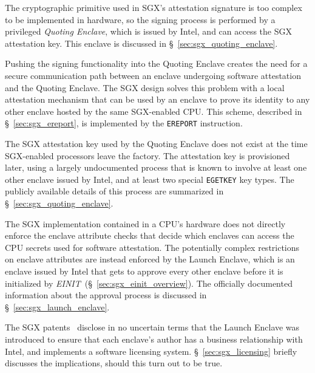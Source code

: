 The cryptographic primitive used in SGX's attestation signature is too complex
to be implemented in hardware, so the signing process is performed by a
privileged \textit{Quoting Enclave}, which is issued by Intel, and can access
the SGX attestation key. This enclave is discussed in
\S~\ref{sec:sgx_quoting_enclave}.

Pushing the signing functionality into the Quoting Enclave creates the need for
a secure communication path between an enclave undergoing software attestation
and the Quoting Enclave. The SGX design solves this problem with a local
attestation mechanism that can be used by an enclave to prove its identity to
any other enclave hosted by the same SGX-enabled CPU. This scheme, described in
\S~\ref{sec:sgx_ereport}, is implemented by the \texttt{EREPORT} instruction.


The SGX attestation key used by the Quoting Enclave does not exist at the time
SGX-enabled processors leave the factory. The attestation key is provisioned
later, using a largely undocumented process that is known to involve at least
one other enclave issued by Intel, and at least two special \texttt{EGETKEY}
key types. The publicly available details of this process are summarized in
\S~\ref{sec:sgx_quoting_enclave}.

The SGX implementation contained in a CPU's hardware does not directly enforce
the enclave attribute checks that decide which enclaves can access the CPU
secrets used for software attestation. The potentially complex restrictions on
enclave attributes are instead enforced by the Launch Enclave, which is an
enclave issued by Intel that gets to approve every other enclave before it is
initialized by \textit{EINIT}~(\S~\ref{sec:sgx_einit_overview}). The officially
documented information about the approval process is discussed in
\S~\ref{sec:sgx_launch_enclave}.


The SGX patents~\cite{intel2013patent1, intel2013patent2} disclose in no
uncertain terms that the Launch Enclave was introduced to ensure that each
enclave's author has a business relationship with Intel, and implements a
software licensing system. \S~\ref{sec:sgx_licensing} briefly discusses the
implications, should this turn out to be true.


